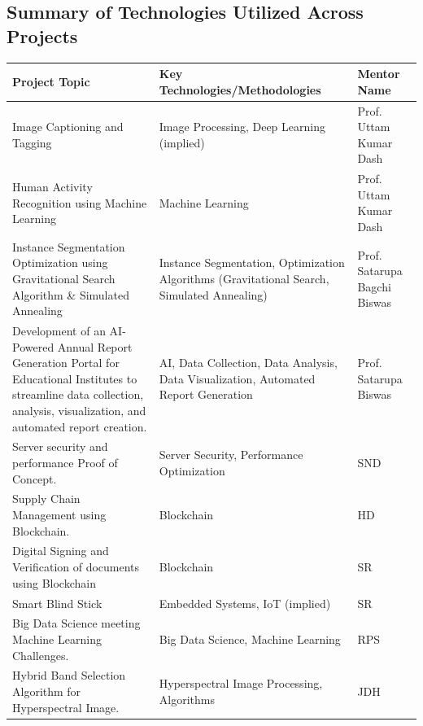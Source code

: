 \documentclass[11pt,a4paper]{article}
\newenvironment{card}{
    \begin{tcolorbox}[
        enhanced,
        colback=cardback,
        colframe=border,
        sharp corners,
        boxrule=0.5pt,
        drop shadow,
        drop shadow={shadow xshift=1mm,shadow yshift=-1mm,fill=border!50},
        boxsep=3mm,
        left=5mm, right=5mm, top=5mm, bottom=5mm,
        width=\textwidth,
        nobeforeafter
    ]
}{\end{tcolorbox}}
\begin{document}
\vspace{0.5cm}

\begin{card}
    \subsection*{\textcolor{accent}{Summary of Technologies Utilized Across Projects}}
    \vspace{0.3cm}
    \begin{longtable}{@{}p{}p{}p{}@{}}
        \toprule
        \textbf{Project Topic} & \textbf{Key Technologies/Methodologies} & \textbf{Mentor Name} \\
        \midrule
        \endhead
        Image Captioning and Tagging & Image Processing, Deep Learning (implied) & Prof. Uttam Kumar Dash \\
        Human Activity Recognition using Machine Learning & Machine Learning & Prof. Uttam Kumar Dash \\
        Instance Segmentation Optimization using Gravitational Search Algorithm \& Simulated Annealing & Instance Segmentation, Optimization Algorithms (Gravitational Search, Simulated Annealing) & Prof. Satarupa Bagchi Biswas \\
        Development of an AI-Powered Annual Report Generation Portal for Educational Institutes to streamline data collection, analysis, visualization, and automated report creation. & AI, Data Collection, Data Analysis, Data Visualization, Automated Report Generation & Prof. Satarupa Biswas \\
        Server security and performance Proof of Concept. & Server Security, Performance Optimization & SND \\
        Supply Chain Management using Blockchain. & Blockchain & HD \\
        Digital Signing and Verification of documents using Blockchain & Blockchain & SR \\
        Smart Blind Stick & Embedded Systems, IoT (implied) & SR \\
        Big Data Science meeting Machine Learning Challenges. & Big Data Science, Machine Learning & RPS \\
        Hybrid Band Selection Algorithm for Hyperspectral Image. & Hyperspectral Image Processing, Algorithms & JDH \\
        \bottomrule
    \end{longtable}
\end{card}
\end{document}
